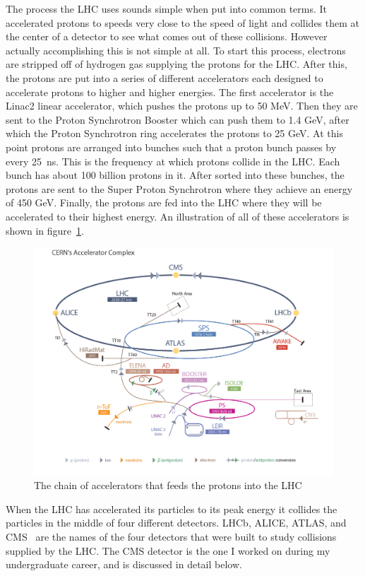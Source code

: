 The process the LHC uses sounds simple when put into common terms. It accelerated protons to speeds very close to the speed of light and collides them at the center of a detector to see what comes out of these collisions. However actually accomplishing this is not simple at all. To start this process, electrons are stripped off of hydrogen gas supplying the protons for the LHC. After this, the protons are put into a series of different accelerators each designed to accelerate protons to higher and higher energies. The first accelerator is the Linac2 linear accelerator, which pushes the protons up to 50 MeV. Then they are sent to the Proton Synchrotron Booster which can push them to 1.4 GeV, after which the Proton Synchrotron ring accelerates the protons to 25 GeV. At this point protons are arranged into bunches such that a proton bunch passes by every 25~ns. This is the frequency at which protons collide in the LHC. Each bunch has about 100 billion protons in it. After sorted into these bunches, the protons are sent to the Super Proton Synchrotron where they achieve an energy of 450 GeV. Finally, the protons are fed into the LHC where they will be accelerated to their highest energy. An illustration of all of these accelerators is shown in figure~\ref{fig:acceleratorcomplex}.

\begin{figure}
\centering
\includegraphics[width=0.8\linewidth]{Figures/acceleratorcomplex.jpg}
\caption{The chain of accelerators that feeds the protons into the LHC}
\label{fig:acceleratorcomplex}
\end{figure}

When the LHC has accelerated its particles to its peak energy it collides the particles in the middle of four different detectors. LHCb, ALICE, ATLAS, and CMS~\cite{CMS} are the names of the four detectors that were built to study collisions supplied by the LHC. The CMS detector is the one I worked on during my undergraduate career, and is discussed in detail below.

